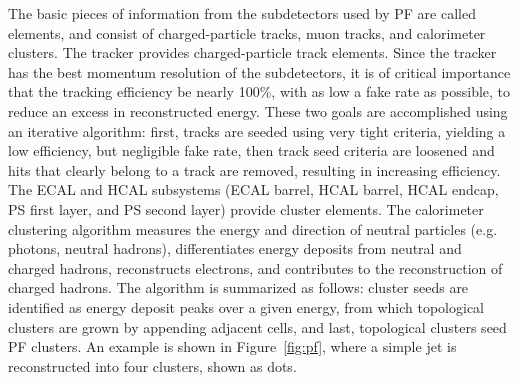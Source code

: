 \indent The basic pieces of information from the subdetectors used by PF are called elements, and consist of charged-particle tracks, muon tracks, and calorimeter clusters. The tracker provides charged-particle track elements. Since the tracker has the best momentum resolution of the subdetectors, it is of critical importance that the tracking efficiency be nearly 100\%, with as low a fake rate as possible, to reduce an excess in reconstructed energy. These two goals are accomplished using an iterative algorithm: first, tracks are seeded using very tight criteria, yielding a low efficiency, but negligible fake rate, then track seed criteria are loosened and hits that clearly belong to a track are removed, resulting in increasing efficiency. The ECAL and HCAL subsystems (ECAL barrel, HCAL barrel, HCAL endcap, PS first layer, and PS second layer) provide cluster elements. The calorimeter clustering algorithm measures the energy and direction of neutral particles (e.g. photons, neutral hadrons), differentiates energy deposits from neutral and charged hadrons, reconstructs electrons, and contributes to the reconstruction of charged hadrons. The algorithm is summarized as follows: cluster seeds are identified as energy deposit peaks over a given energy, from which topological clusters are grown by appending adjacent cells, and last, topological clusters seed PF clusters. An example is shown in Figure~\ref{fig:pf}, where a simple jet is reconstructed into four clusters, shown as dots. 


